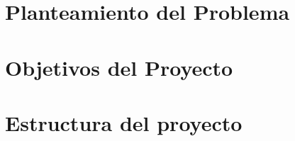 \section{Planteamiento del Problema}

\section{Objetivos del Proyecto}

\section{Estructura del proyecto}
